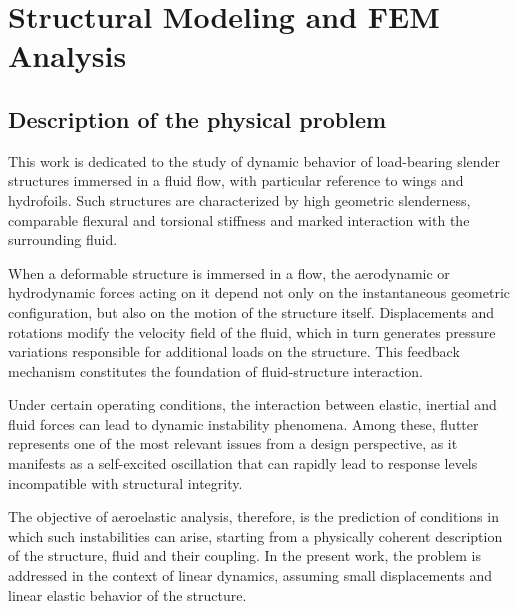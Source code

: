 \chapter{Structural Modeling and FEM Analysis}
\label{chap:structure}

\section{Description of the physical problem}
This work is dedicated to the study of dynamic behavior of load-bearing slender structures immersed in a fluid flow,
with particular reference to wings and hydrofoils. Such structures are characterized by high geometric slenderness, comparable flexural
and torsional stiffness and marked interaction with the surrounding fluid.

When a deformable structure is immersed in a flow, the aerodynamic or hydrodynamic forces acting on it depend not only
on the instantaneous geometric configuration, but also on the motion of the structure itself. Displacements and rotations modify
the velocity field of the fluid, which in turn generates pressure variations responsible for additional loads on the structure. This
feedback mechanism constitutes the foundation of fluid-structure interaction.

Under certain operating conditions, the interaction between elastic, inertial and fluid forces can lead to dynamic instability phenomena.
Among these, flutter represents one of the most relevant issues from a design perspective, as it manifests as a self-excited oscillation
that can rapidly lead to response levels incompatible with structural integrity.

The objective of aeroelastic analysis, therefore, is the prediction of conditions in which such instabilities can arise, starting from a physically
coherent description of the structure, fluid and their coupling. In the present work, the problem is addressed in the context of linear dynamics, 
assuming small displacements and linear elastic behavior of the structure.

